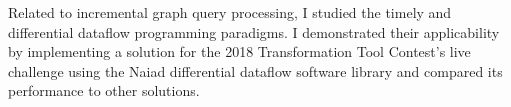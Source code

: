 Related to incremental graph query processing, I studied the timely and differential dataflow programming paradigms. I demonstrated their applicability by implementing a solution for the 2018 Transformation Tool Contest’s live challenge using the Naiad differential dataflow software library and compared its performance to other solutions.
\vfill
\selectthesislanguage

\setcounter{romanPage}{\value{page}}

